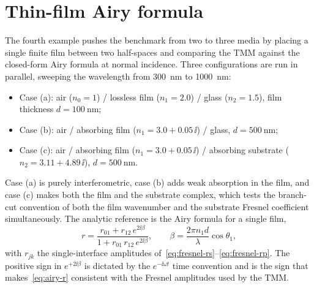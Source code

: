\section{Thin-film Airy formula}

The fourth example pushes the benchmark from two to three media by placing
a single finite film between two half-spaces and comparing the TMM against
the closed-form Airy formula at normal incidence. Three configurations are
run in parallel, sweeping the wavelength from \SI{300}{\nano\metre} to
\SI{1000}{\nano\metre}:

\begin{itemize}
  \setlength{\itemsep}{0.2em}
  \item Case (a): air ($n_0 = 1$) / lossless film ($n_1 = 2.0$) / glass ($n_2 = 1.5$), film thickness $d = \SI{100}{\nano\metre}$;
  \item Case (b): air / absorbing film ($n_1 = 3.0 + 0.05\,\ii$) / glass, $d = \SI{500}{\nano\metre}$;
  \item Case (c): air / absorbing film ($n_1 = 3.0 + 0.05\,\ii$) / absorbing substrate ($n_2 = 3.11 + 4.89\,\ii$), $d = \SI{500}{\nano\metre}$.
\end{itemize}

Case (a) is purely interferometric, case (b) adds weak absorption in the
film, and case (c) makes both the film and the substrate complex, which
tests the branch-cut convention of both the film wavenumber and the
substrate Fresnel coefficient simultaneously. The analytic reference is
the Airy formula for a single film,
\begin{equation}
  r = \frac{r_{01} + r_{12}\,e^{2\ii\beta}}{1 + r_{01}\,r_{12}\,e^{2\ii\beta}},\qquad \beta = \frac{2\pi n_1 d}{\lambda}\cos\theta_1, \label{eq:airy-r}
\end{equation}
with $r_{jk}$ the single-interface amplitudes
of~\eqref{eq:fresnel-rs}--\eqref{eq:fresnel-rp}. The positive sign in
$e^{+2\ii\beta}$ is dictated by the $e^{-\ii\omega t}$ time convention and
is the sign that makes~\eqref{eq:airy-r} consistent with the Fresnel
amplitudes used by the TMM.

\begin{center}
\end{center}


